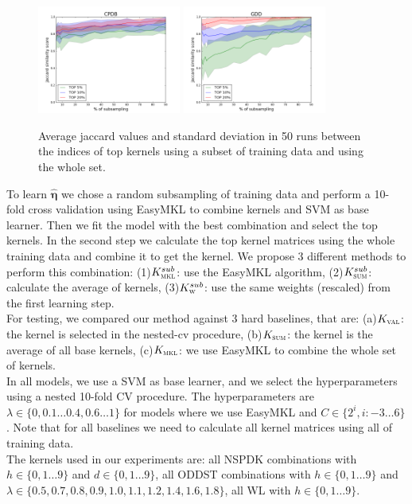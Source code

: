 \documentclass{esannV2}
\newcommand{\1}{{\bf 1}}
\newcommand{\kval}{$K_{\textsc{val}}$}
\newcommand{\ksum}{$K_{\textsc{sum}}$}
\newcommand{\kmkl}{$K_{\textsc{mkl}}$}
\newcommand{\ksmkl}{$K_{\textsc{mkl}}^{sub}$}
\newcommand{\kssum}{$K_{\textsc{sum}}^{sub}$}
\newcommand{\ksw}{$K_{\textsc{w}}^{sub}$}
\begin{document}
\begin{figure}[!htb]
\centering
\includegraphics[width=0.42\textwidth]{img/CPDB_jaccard.png}
\includegraphics[width=0.42\textwidth]{img/GDD_jaccard.png}
\caption{Average jaccard values and standard deviation in 50 runs between the indices of top kernels using a subset of training data and using the whole set.}
\label{fig:jaccard}
\end{figure}

To learn $\hat{\boldsymbol{\eta}}$ we chose a random subsampling of training data and perform a 10-fold cross validation using EasyMKL to combine kernels and SVM as base learner. Then we fit the model with the best combination and select the top kernels.
In the second step we calculate the top kernel matrices using the whole training data and combine it to get the kernel. We propose 3 different methods to perform this combination:
(1)\ksmkl: use the EasyMKL algorithm, (2)\kssum: calculate the average of kernels, (3)\ksw: use the same weights (rescaled) from the first learning step.\\
For testing, we compared our method against 3 hard baselines, that are: (a)\kval: the kernel is selected in the nested-cv procedure, (b)\ksum: the kernel is the average of all base kernels, (c)\kmkl: we use EasyMKL to combine the whole set of kernels.\\
In all models, we use a SVM as base learner, and we select the hyperparameters using a nested 10-fold CV procedure. The hyperparameters are $\lambda\in\{0,0.1\dots0.4,0.6\dots1\}$ for models where we use EasyMKL and $C\in\{2^i, i:-3\dots6\}$.
Note that for all baselines we need to calculate all kernel matrices using all of training data.\\
The kernels used in our experiments are: all NSPDK combinations with $h \in \{0,1\dots9\}$ and $d \in \{0,1\dots9\}$, all ODDST combinations with $h \in \{0,1\dots9\}$ and $\lambda \in \{0.5, 0.7,0.8,0.9,1.0,1.1,1.2,1.4,1.6,1.8\}$, all WL with $h \in \{0,1\dots9\}$.
\end{document}
